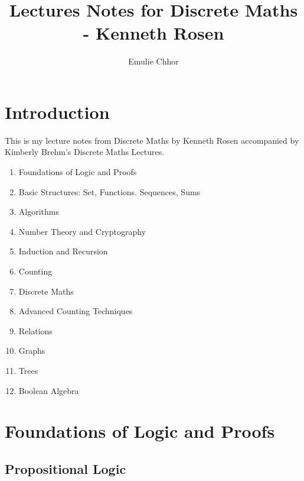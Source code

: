 \documentclass{article}
\begin{document}
\title{Lectures Notes for Discrete Maths - Kenneth Rosen}
\author{Emulie Chhor}
\maketitle

\section*{Introduction}

This is my lecture notes from Discrete Maths by Kenneth Rosen accompanied
by Kimberly Brehm's Discrete Maths Lectures.

\begin{enumerate}
    \item Foundations of Logic and Proofs
    \item Basic Structures: Set, Functions. Sequences, Sums
    \item Algorithms
    \item Number Theory and Cryptography
    \item Induction and Recursion
    \item Counting
    \item Discrete Maths
    \item Advanced Counting Techniques
    \item Relations
    \item Graphs
    \item Trees
    \item Boolean Algebra
\end{enumerate}

\newtheorem{definition}{Definition}[subsection]
\newtheorem{theorem}{Theorem}[subsection]
\newtheorem{corollary}{Corollary}[subsection]
\newtheorem{lemma}[theorem]{Lemma}
\newtheorem{proposition}{Proposition}[section]
\newtheorem{axiom}{Axiome}
\newtheorem{property}{Propriété}[subsection]
\newtheorem*{remark}{Remarque}
\newtheorem*{problem}{Problème}
\newtheorem*{intuition}{Intuition}

\section{Foundations of Logic and Proofs}

\subsection{Propositional Logic}%
\label{sub:Propositional Logic}
\end{document}
